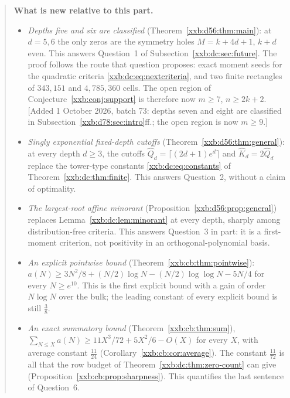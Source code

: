 \documentclass[11pt,a4paper]{article}
\numberwithin{equation}{section}
\theoremstyle{definition}
\theoremstyle{remark}
\theoremstyle{plain}
\begin{document}
\begin{quote}
\smallskip
\textbf{What is new relative to this part.}
\begin{itemize}[leftmargin=1.4em,itemsep=1pt]
\item \emph{Depths five and six are classified}
 (Theorem~\ref{xxb:d56:thm:main}): at $d=5,6$ the only zeros are the symmetry
 holes $M=k+4d+1$, $k+d$ even.  This answers Question~1 of
 Subsection~\ref{xxb:dc:sec:future}.  The proof follows the route that
 question proposes: exact moment seeds for the quadratic criteria
 \eqref{xxb:dc:eq:nextcriteria}, and two finite rectangles of $343{,}151$ and
 $4{,}785{,}360$ cells.  The open region of
 Conjecture~\ref{xxb:conj:support} is therefore now $m\ge7$, $n\ge2k+2$.
 [Added 1 October 2026, batch 73: depths seven and eight are classified in
 Subsection~\ref{xxb:d78:sec:intro}ff.; the open region is now $m\ge9$.]
\item \emph{Singly exponential fixed-depth cutoffs}
 (Theorem~\ref{xxb:d56:thm:general}): at every depth $d\ge3$, the cutoffs
 $\widehat Q_d=\lceil(2d+1)e^d\rceil$ and $\widehat K_d=2\widehat Q_d$
 replace the tower-type constants \eqref{xxb:dc:eq:constants} of
 Theorem~\ref{xxb:dc:thm:finite}.  This answers Question~2, without a claim of
 optimality.
\item \emph{The largest-root affine minorant}
 (Proposition~\ref{xxb:d56:prop:general}) replaces
 Lemma~\ref{xxb:dc:lem:minorant} at every depth, sharply among distribution-free
 criteria.  This answers Question~3 in part: it is a first-moment criterion,
 not positivity in an orthogonal-polynomial basis.
\item \emph{An explicit pointwise bound} (Theorem~\ref{xxb:cb:thm:pointwise}):
 $a(N)\ge3N^2/8+(N/2)\log N-(N/2)\log\log N-5N/4$ for every $N\ge e^{10}$.
 This is the first explicit bound with a gain of order $N\log N$ over the
 bulk; the leading constant of every explicit bound is still $\tfrac38$.
\item \emph{An exact summatory bound} (Theorem~\ref{xxb:cb:thm:sum}),
 $\sum_{N\le X}a(N)\ge11X^3/72+5X^2/6-O(X)$ for every $X$, with average
 constant $\tfrac{11}{24}$ (Corollary~\ref{xxb:cb:cor:average}).  The constant
 $\tfrac{11}{72}$ is all that the row budget of
 Theorem~\ref{xxb:dc:thm:zero-count} can give
 (Proposition~\ref{xxb:cb:prop:sharpness}).  This quantifies the last
 sentence of Question~6.
\end{itemize}


\end{quote}
\end{document}
